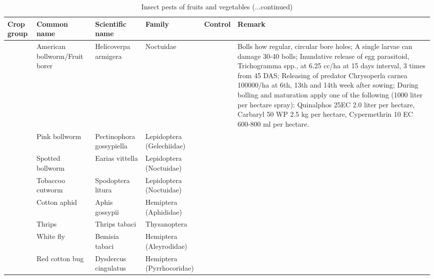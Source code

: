 \documentclass[10pt,dvipsnames,ignorenonframetext,aspectratio=169]{beamer}
\begin{document}
\begin{frame}{}
\protect\hypertarget{section-16}{}
\begin{table}

\caption{\label{tab:unnamed-chunk-4}Insect pests of fruits and vegetables (...continued)}
\centering
\fontsize{4}{6}\selectfont
\begin{tabular}[t]{>{\raggedright\arraybackslash}p{5em}>{\raggedright\arraybackslash}p{10em}>{\raggedright\arraybackslash}p{15em}>{\raggedright\arraybackslash}p{12em}>{\raggedright\arraybackslash}p{6em}>{\raggedright\arraybackslash}p{22em}}
\toprule
Crop group & Common name & Scientific name & Family & Control & Remark\\
\midrule
 & American bollworm/Fruit borer & Helicoverpa armigera & Noctuidae &  & Bolls how regular, circular bore holes; A single larvae can damage 30-40 bolls; Inundative release of egg parasitoid, Trichogramma spp., at 6.25 cc/ha at 15 days interval, 3 times from 45 DAS; Releasing of predator Chrysoperla carnea 100000/ha at 6th, 13th and 14th week after sowing; During bolling and maturation apply one of the following (1000 liter per hectare spray): Quinalphos 25EC 2.0 liter per hectare, Carbaryl 50 WP 2.5 kg per hectare, Cypermethrin 10 EC 600-800 ml per hectare.\\
\cmidrule{2-6}
 & Pink bollworm & Pectinophora gossypiella & Lepidoptera (Gelechiidae) &  & \\
\cmidrule{2-6}
 & Spotted bollworm & Earias vittella & Lepidoptera (Noctuidae) &  & \\
\cmidrule{2-6}
 & Tobaccoo cutworm & Spodoptera litura & Lepidoptera (Noctuidae) &  & \\
\cmidrule{2-6}
 & Cotton aphid & Aphis gossypii & Hemiptera (Aphididae) &  & \\
\cmidrule{2-6}
 & Thrips & Thrips tabaci & Thysanoptera &  & \\
\cmidrule{2-6}
 & White fly & Bemisia tabaci & Hemiptera (Aleyrodidae) &  & \\
\cmidrule{2-6}
\multirow{-8}{5em}{\raggedright\arraybackslash Cotton} & Red cotton bug & Dysdercus cingulatus & Hemiptera (Pyrrhocoridae) &  & \\
\bottomrule
\end{tabular}
\end{table}
\end{frame}
\end{document}

